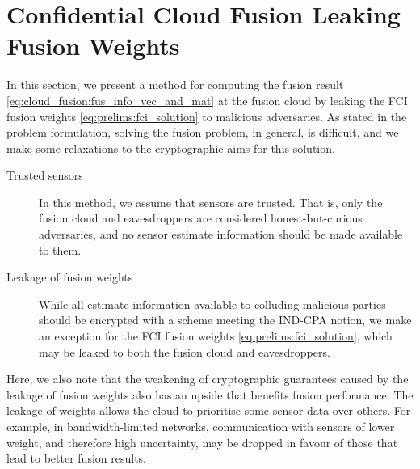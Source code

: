 % 
%                                                                               
%                                                                               
%                                                                               
% 

\section{Confidential Cloud Fusion Leaking Fusion Weights}\label{sec:cloud_fusion:secfci}
In this section, we present a method for computing the fusion result \eqref{eq:cloud_fusion:fus_info_vec_and_mat} at the fusion cloud by leaking the FCI fusion weights \eqref{eq:prelims:fci_solution} to malicious adversaries. As stated in the problem formulation, solving the fusion problem, in general, is difficult, and we make some relaxations to the cryptographic aims for this solution.
\begin{description}
    \item[Trusted sensors] In this method, we assume that sensors are trusted. That is, only the fusion cloud and eavesdroppers are considered honest-but-curious adversaries, and no sensor estimate information should be made available to them.
    \item[Leakage of fusion weights] While all estimate information available to colluding malicious parties should be encrypted with a scheme meeting the IND-CPA notion, we make an exception for the FCI fusion weights \eqref{eq:prelims:fci_solution}, which may be leaked to both the fusion cloud and eavesdroppers.
\end{description}
Here, we also note that the weakening of cryptographic guarantees caused by the leakage of fusion weights also has an upside that benefits fusion performance. The leakage of weights allows the cloud to prioritise some sensor data over others. For example, in bandwidth-limited networks, communication with sensors of lower weight, and therefore high uncertainty, may be dropped in favour of those that lead to better fusion results.

